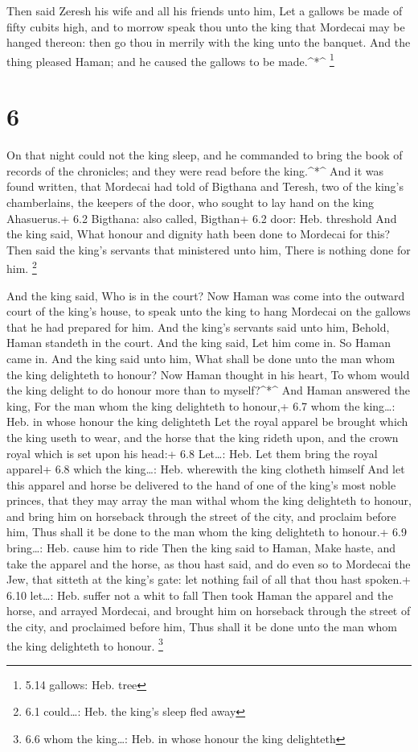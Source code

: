  Then said Zeresh his wife and all his friends unto him,
Let a gallows be made of fifty cubits high, and to morrow speak thou
unto the king that Mordecai may be hanged thereon: then go thou in
merrily with the king unto the banquet. And the thing pleased Haman; and
he caused the gallows to be made.\^{}*\^{} \footnote{5.14 gallows: Heb.
  tree}

\hypertarget{section-5}{%
\section{6}\label{section-5}}

 On that night could not the king sleep, and he commanded to
bring the book of records of the chronicles; and they were read before
the king.\^{}*\^{}  And it was found written, that Mordecai
had told of Bigthana and Teresh, two of the king's chamberlains, the
keepers of the door, who sought to lay hand on the king Ahasuerus.+ 6.2
Bigthana: also called, Bigthan+ 6.2 door: Heb. threshold 
And the king said, What honour and dignity hath been done to Mordecai
for this? Then said the king's servants that ministered unto him, There
is nothing done for him. \footnote{6.1 could\ldots: Heb. the king's
  sleep fled away}

 And the king said, Who is in the court? Now Haman was come
into the outward court of the king's house, to speak unto the king to
hang Mordecai on the gallows that he had prepared for him. 
And the king's servants said unto him, Behold, Haman standeth in the
court. And the king said, Let him come in.  So Haman came
in. And the king said unto him, What shall be done unto the man whom the
king delighteth to honour? Now Haman thought in his heart, To whom would
the king delight to do honour more than to myself?\^{}*\^{} 
And Haman answered the king, For the man whom the king delighteth to
honour,+ 6.7 whom the king\ldots: Heb. in whose honour the king
delighteth  Let the royal apparel be brought which the king
useth to wear, and the horse that the king rideth upon, and the crown
royal which is set upon his head:+ 6.8 Let\ldots: Heb. Let them bring
the royal apparel+ 6.8 which the king\ldots: Heb. wherewith the king
clotheth himself  And let this apparel and horse be
delivered to the hand of one of the king's most noble princes, that they
may array the man withal whom the king delighteth to honour, and bring
him on horseback through the street of the city, and proclaim before
him, Thus shall it be done to the man whom the king delighteth to
honour.+ 6.9 bring\ldots: Heb. cause him to ride  Then the
king said to Haman, Make haste, and take the apparel and the horse, as
thou hast said, and do even so to Mordecai the Jew, that sitteth at the
king's gate: let nothing fail of all that thou hast spoken.+ 6.10
let\ldots: Heb. suffer not a whit to fall  Then took Haman
the apparel and the horse, and arrayed Mordecai, and brought him on
horseback through the street of the city, and proclaimed before him,
Thus shall it be done unto the man whom the king delighteth to honour.
\footnote{6.6 whom the king\ldots: Heb. in whose honour the king
  delighteth}

